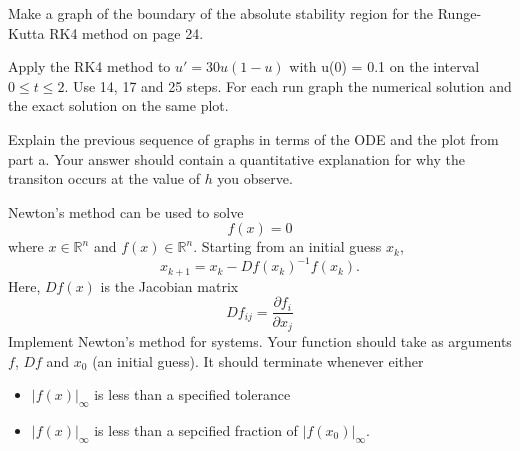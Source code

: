 \documentclass[minion]{homework}
\newcommand{\Reals}{\mathbb{R}}
\begin{document}
\begin{problems}

\problem 
\begin{subproblems}
\item
Make a graph of the boundary of the absolute stability
region for the Runge-Kutta RK4 method on page 24.

\item Apply the RK4 method to $u'=30u(1-u)$ with u(0) = 0.1 on the 
interval $0\le t\le 2$. Use 14, 17 and 25 steps. For each run
graph the numerical solution and 
the exact solution on the same plot. 

\item Explain the previous sequence of graphs in terms of the ODE and
the plot from part a.  Your answer should contain a quantitative explanation
for why the transiton occurs at the value of $h$ you observe.
\end{subproblems}


\problem Newton's method can be used to solve
\[
f(x)=0
\]
where $x\in\Reals^n$ and $f(x)\in \Reals^n$.
Starting from an initial guess $x_k$,
\[
x_{k+1} = x_k - Df(x_k)^{-1} f(x_k).
\]
Here, $Df(x)$ is the Jacobian matrix
\[
Df_{ij} = \frac{\partial f_i}{\partial x_j}
\]
Implement Newton's method for systems.  Your
function should take as arguments $f$, $Df$
and $x_0$ (an initial guess).  It should terminate
whenever either 
\begin{itemize}
\item $|f(x)|_\infty$ is less than a specified tolerance
\item $|f(x)|_\infty$ is less than a sepcified fraction of $|f(x_0)|_\infty$.
\end{itemize}


\end{problems}
\end{document}
